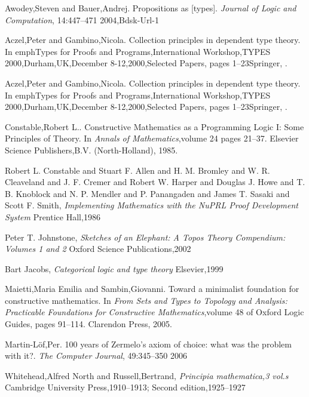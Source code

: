 \documentclass[12pt]{article}
\begin{document}
\begin{thebibliography}{99}

 {Awodey,Steven and Bauer,Andrej}. {Propositions as [types]}. \emph{Journal of Logic and Computation}, {14}:{447--471} {2004},Bdsk-Url-1

 {Aczel,Peter and Gambino,Nicola}. {Collection principles in dependent type theory}. In emph{Types for Proofs and Programs,International Workshop,TYPES 2000,Durham,UK,December 8-12,2000,Selected Papers}, pages {1--23}{Springer}, .

 {Aczel,Peter and Gambino,Nicola}. {Collection principles in dependent type theory}. In emph{Types for Proofs and Programs,International Workshop,TYPES 2000,Durham,UK,December 8-12,2000,Selected Papers}, pages {1--23}{Springer}, .

 {Constable,Robert L.}. {Constructive Mathematics as a Programming Logic {I}: Some Principles of Theory}. In \emph{Annals of Mathematics},volume 24 pages {21--37}. {Elsevier Science Publishers,B.V. (North-Holland)}, 1985.

 {Robert L. Constable and Stuart F. Allen and H. M. Bromley and W. R. Cleaveland and J. F. Cremer and Robert W. Harper and Douglas J. Howe and T. B. Knoblock and N. P. Mendler and P. Panangaden and James T. Sasaki and Scott F. Smith}, \emph{{Implementing Mathematics with the {NuPRL} Proof Development System}}  {Prentice Hall},1986

 {Peter T. Johnstone}, \emph{{Sketches of an Elephant: A Topos Theory Compendium: Volumes 1 and 2}}  {Oxford Science Publications},{2002}

 {Bart Jacobs}, \emph{{Categorical logic and type theory}}  {Elsevier},{1999}

 {Maietti,Maria Emilia and Sambin,Giovanni}. {Toward a minimalist foundation for constructive mathematics}. In \emph{From Sets and Types to Topology and Analysis: Practicable Foundations for Constructive Mathematics},volume 48 of {Oxford Logic Guides}, pages {91--114}. {Clarendon Press}, 2005.

 {Martin-L{\"o}f,Per}. {100 years of {Z}ermelo's axiom of choice: what was the problem with it?}. \emph{The Computer Journal}, {49}:{345--350} {2006}

 {Whitehead,Alfred North and Russell,Bertrand}, \emph{{Principia mathematica,3 vol.s}}  {Cambridge University Press},{1910--1913; Second edition,1925--1927}


\end{thebibliography}
\end{document}
